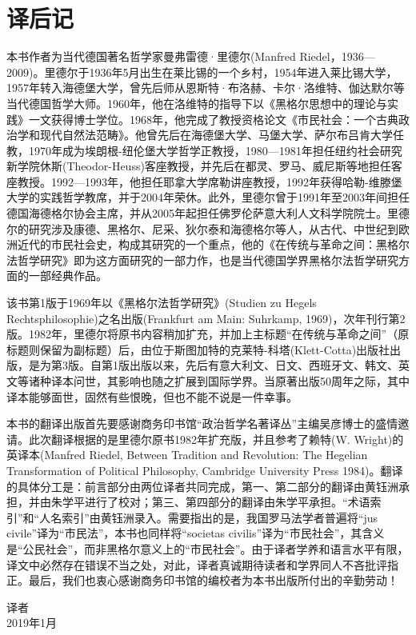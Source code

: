 \chapter*{译后记}

本书作者为当代德国著名哲学家曼弗雷德·里德尔(Manfred Riedel，1936—2009)。里德尔于1936年5月出生在莱比锡的一个乡村，1954年进入莱比锡大学，1957年转入海德堡大学，曾先后师从恩斯特·布洛赫、卡尔·洛维特、伽达默尔等当代德国哲学大师。1960年，他在洛维特的指导下以《黑格尔思想中的理论与实践》一文获得博士学位。1968年，他完成了教授资格论文《市民社会：一个古典政治学和现代自然法范畴》。他曾先后在海德堡大学、马堡大学、萨尔布吕肯大学任教，1970年成为埃朗根-纽伦堡大学哲学正教授，1980—1981年担任纽约社会研究新学院休斯(Theodor-Heuss)客座教授，并先后在都灵、罗马、威尼斯等地担任客座教授。1992—1993年，他担任耶拿大学席勒讲座教授，1992年获得哈勒-维滕堡大学的实践哲学教席，并于2004年荣休。此外，里德尔曾于1991年至2003年间担任德国海德格尔协会主席，并从2005年起担任佛罗伦萨意大利人文科学院院士。里德尔的研究涉及康德、黑格尔、尼采、狄尔泰和海德格尔等人，从古代、中世纪到欧洲近代的市民社会史，构成其研究的一个重点，他的《在传统与革命之间：黑格尔法哲学研究》即为这方面研究的一部力作，也是当代德国学界黑格尔法哲学研究方面的一部经典作品。

该书第1版于1969年以《黑格尔法哲学研究》(Studien zu Hegels Rechtsphilosophie)之名出版(Frankfurt am Main: Suhrkamp, 1969)，次年刊行第2版。1982年，里德尔将原书内容稍加扩充，并加上主标题“在传统与革命之间”（原标题则保留为副标题）后，由位于斯图加特的克莱特-科塔(Klett-Cotta)出版社出版，是为第3版。自第1版出版以来，先后有意大利文、日文、西班牙文、韩文、英文等诸种译本问世，其影响也随之扩展到国际学界。当原著出版50周年之际，其中译本能够面世，固然有些恨晚，但也不能不说是一件幸事。

本书的翻译出版首先要感谢商务印书馆“政治哲学名著译丛”主编吴彦博士的盛情邀请。此次翻译根据的是里德尔原书1982年扩充版，并且参考了赖特(W. Wright)的英译本(Manfred Riedel, Between Tradition and Revolution: The Hegelian Transformation of Political Philosophy, Cambridge University Press 1984)。翻译的具体分工是：前言部分由两位译者共同完成，第一、第二部分的翻译由黄钰洲承担，并由朱学平进行了校对；第三、第四部分的翻译由朱学平承担。“术语索引”和“人名索引”由黄钰洲录入。需要指出的是，我国罗马法学者普遍将“jus civile”译为“市民法”，本书也同样将“societas civilis”译为“市民社会”，其含义是“公民社会”，而非黑格尔意义上的“市民社会”。由于译者学养和语言水平有限，译文中必然存在错误不当之处，对此，译者真诚期待读者和学界同人不吝批评指正。最后，我们也衷心感谢商务印书馆的编校者为本书出版所付出的辛勤劳动！

\begin{flushright}
译者\\
2019年1月
\end{flushright}